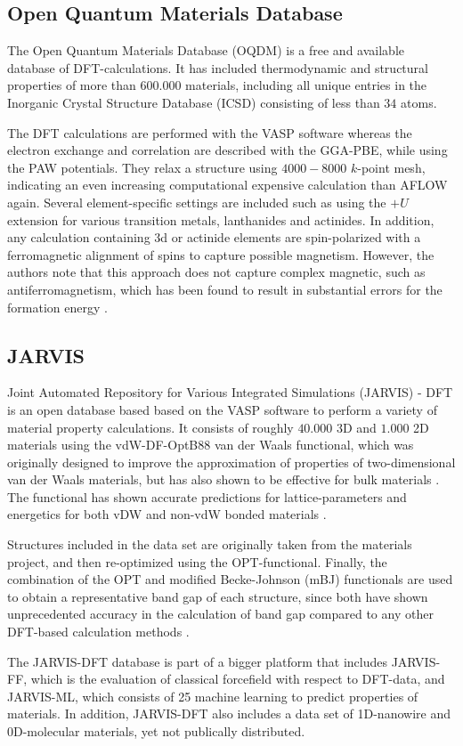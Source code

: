 \subsection{Open Quantum Materials Database}

The Open Quantum Materials Database (OQDM) \cite{Saal2013, Kirklin2015} is a free and available database of DFT-calculations. It has included thermodynamic and structural properties of more than $600.000$ materials, including all unique entries in the Inorganic Crystal Structure Database (ICSD) consisting of less than $34$ atoms.

The DFT calculations are performed with the VASP software whereas the electron exchange and correlation are described with the GGA-PBE, while using the PAW potentials. They relax a structure using $4000-8000$ $k$-point mesh, indicating an even increasing computational expensive calculation than AFLOW again. Several element-specific settings are included such as using the $+U$ extension for various transition metals, lanthanides and actinides. In addition, any calculation containing 3d or actinide elements are spin-polarized with a ferromagnetic alignment of spins to capture possible magnetism. However, the authors note that this approach does not capture complex magnetic, such as antiferromagnetism, which has been found to result in substantial errors for the formation energy \cite{Stevanovic2012}.

\subsection{JARVIS}

Joint Automated Repository for Various Integrated Simulations (JARVIS) \cite{Choudhary2020} - DFT is an open database based based on the VASP software to perform a variety of material property calculations. It consists of roughly $40.000$ 3D and $1.000$ 2D materials using the vdW-DF-OptB88 van der Waals functional, which was originally designed to improve the approximation of properties of two-dimensional van der Waals materials, but has also shown to be effective for bulk materials \cite{Thonhauser2007, Klimes2011}. The functional has shown accurate predictions for lattice-parameters and energetics for both vDW and non-vdW bonded materials  \cite{Choudhary2018}.

Structures included in the data set are originally taken from the materials project, and then re-optimized using the OPT-functional. Finally, the combination of the OPT and modified Becke-Johnson (mBJ) functionals are used to obtain a representative band gap of each structure, since both have shown unprecedented accuracy in the calculation of band gap compared to any other DFT-based calculation methods \cite{Choudhary2018a}.

The JARVIS-DFT database is part of a bigger platform that includes JARVIS-FF, which is the evaluation of classical forcefield with respect to DFT-data, and JARVIS-ML, which consists of 25 machine learning to predict properties of materials. In addition, JARVIS-DFT also includes a data set of 1D-nanowire and 0D-molecular materials, yet not publically distributed.
